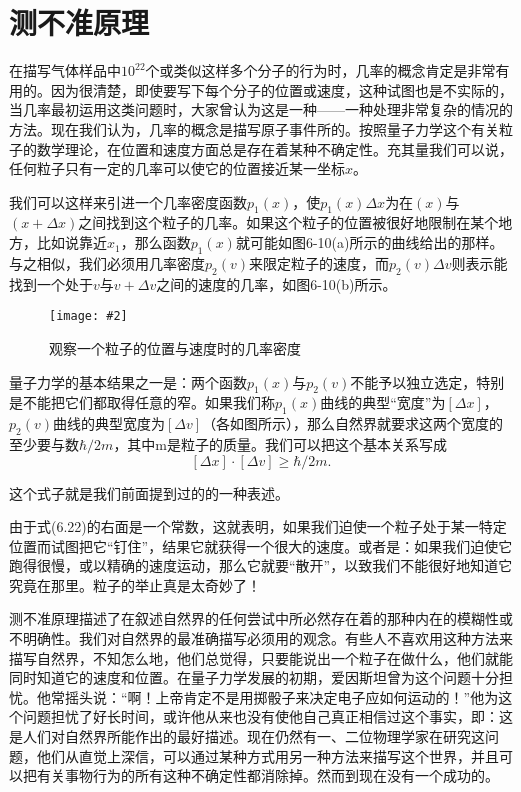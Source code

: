 \documentclass[12pt,oneside]{book}
\newenvironment{fig}[2][1]
{\begin{figure}[H]
\centering
\texttt{[image: \#2]}}
{\end{figure}}
\begin{document}
\section{测不准原理}
在描写气体样品中$10^{22}$个或类似这样多个分子的行为时，几率的概念肯定是非常有用的。因为很清楚，即使要写下每个分子的位置或速度，这种试图也是不实际的，当几率最初运用这类问题时，大家曾认为这是一种——一种处理非常复杂的情况的方法。现在我们认为，几率的概念是描写原子事件所的。按照量子力学这个有关粒子的数学理论，在位置和速度方面总是存在着某种不确定性。充其量我们可以说，任何粒子只有一定的几率可以使它的位置接近某一坐标$x$。

我们可以这样来引进一个几率密度函数$p_1(x)$，使$p_1(x)\Delta x$为在$(x)$与$(x+\Delta x)$之间找到这个粒子的几率。如果这个粒子的位置被很好地限制在某个地方，比如说靠近$x_1$，那么函数$p_1(x)$就可能如图6-10(a)所示的曲线给出的那样。与之相似，我们必须用几率密度$p_2(v)$来限定粒子的速度，而$p_2(v)\Delta v$则表示能找到一个处于$v$与$v+\Delta v$之间的速度的几率，如图6-10(b)所示。
\begin{fig}{观察一个粒子的位置与速度时的几率密度}
\caption{观察一个粒子的位置与速度时的几率密度}
\label{fig:观察一个粒子的位置与速度时的几率密度}
\end{fig}

量子力学的基本结果之一是：两个函数$p_1(x)$与$p_2(v)$不能予以独立选定，特别是不能把它们都取得任意的窄。如果我们称$p_1(x)$曲线的典型“宽度”为$[\Delta x]$，$p_2(v)$曲线的典型宽度为$[\Delta v]$（各如图所示），那么自然界就要求这两个宽度的至少要与数$\hbar/2m$，其中m是粒子的质量。我们可以把这个基本关系写成
\begin{equation}
\label{Eq:I:6:22}
[\Delta x]\cdot[\Delta v]\geq\hbar/2m.
\end{equation}

这个式子就是我们前面提到过的的一种表述。

由于式(6.22)的右面是一个常数，这就表明，如果我们迫使一个粒子处于某一特定位置而试图把它“钉住”，结果它就获得一个很大的速度。或者是：如果我们迫使它跑得很慢，或以精确的速度运动，那么它就要“散开”，以致我们不能很好地知道它究竟在那里。粒子的举止真是太奇妙了！

测不准原理描述了在叙述自然界的任何尝试中所必然存在着的那种内在的模糊性或不明确性。我们对自然界的最准确描写必须用的观念。有些人不喜欢用这种方法来描写自然界，不知怎么地，他们总觉得，只要能说出一个粒子在做什么，他们就能同时知道它的速度和位置。在量子力学发展的初期，爱因斯坦曾为这个问题十分担忧。他常摇头说：“啊！上帝肯定不是用掷骰子来决定电子应如何运动的！”他为这个问题担忧了好长时间，或许他从来也没有使他自己真正相信过这个事实，即：这是人们对自然界所能作出的最好描述。现在仍然有一、二位物理学家在研究这问题，他们从直觉上深信，可以通过某种方式用另一种方法来描写这个世界，并且可以把有关事物行为的所有这种不确定性都消除掉。然而到现在没有一个成功的。
\end{document}
